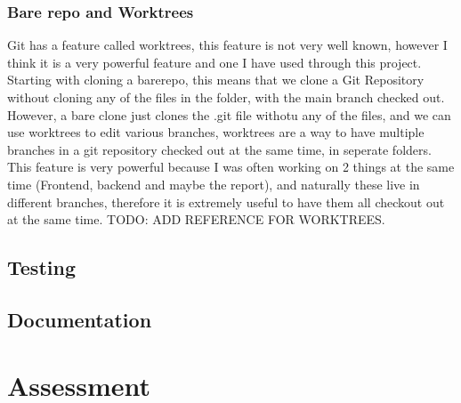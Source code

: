 \documentclass[titlepage]{article}
\begin{document}
\subsubsection{Bare repo and Worktrees}
Git has a feature called worktrees, this feature is not very well known, however I think it is a very powerful feature and one I have used through this project. Starting with cloning a barerepo, this means that we clone a Git Repository without cloning any of the files in the folder, with the main branch checked out. However, a bare clone just clones the .git file withotu any of the files, and we can use worktrees to edit various branches, worktrees are a way to have multiple branches in a git repository checked out at the same time, in seperate folders. This feature is very powerful because I was often working on 2 things at the same time (Frontend, backend and maybe the report), and naturally these live in different branches, therefore it is extremely useful to have them all checkout out at the same time. TODO: ADD REFERENCE FOR WORKTREES.

\subsection{Testing}

\subsection{Documentation}

\section{Assessment}



\end{document}
